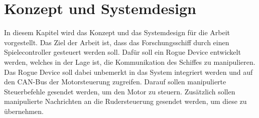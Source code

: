 \chapter{Konzept und Systemdesign}

In diesem Kapitel wird das Konzept und das Systemdesign für die Arbeit vorgestellt. Das Ziel der Arbeit ist, dass 
das Forschungsschiff durch einen Spielecontroller
gesteuert werden soll. Dafür soll ein Rogue Device entwickelt werden, welches in der Lage ist, die Kommunikation des Schiffes zu manipulieren. 
Das Rogue Device soll dabei unbemerkt in das System integriert werden und auf den CAN-Bus der Motorsteuerung zugreifen. Darauf sollen
manipulierte Steuerbefehle gesendet werden, um den Motor zu steuern. Zusätzlich sollen manipulierte Nachrichten
an die Rudersteuerung gesendet werden, um diese zu übernehmen. \\

